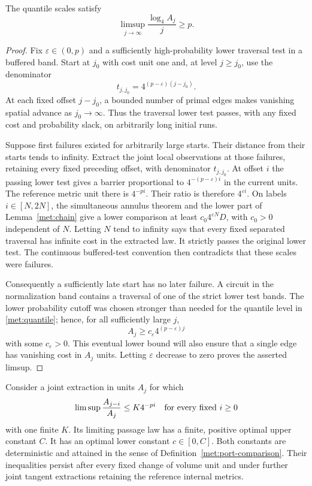 \begin{lemma}
\label{met:initial-growth}
The quantile scales satisfy
\[
 \limsup_{j\to\infty}\frac{\log_4 A_j}{j}\geq p.
\]
\end{lemma}

\begin{proof}
Fix $\varepsilon\in(0,p)$ and a sufficiently high-probability lower
traversal test in a buffered band.  Start at $j_0$ with cost unit one
and, at level $j\geq j_0$, use the denominator
\[
 t_{j,j_0}=4^{(p-\varepsilon)(j-j_0)}.
\]
At each fixed offset $j-j_0$, a bounded number of primal edges makes
vanishing spatial advance as $j_0\to\infty$.  Thus the traversal
lower test passes, with any fixed cost and probability slack, on
arbitrarily long initial runs.

Suppose first failures existed for arbitrarily large starts.  Their
distance from their starts tends to infinity.  Extract the joint local
observations at those failures, retaining every fixed preceding
offset, with denominator $t_{j,j_0}$.  At offset $i$ the passing lower
test gives a barrier proportional to
$4^{-(p-\varepsilon)i}$ in the current units.  The reference metric
unit there is $4^{-pi}$.  Their ratio is therefore $4^{\varepsilon i}$.
On labels $i\in[N,2N]$, the simultaneous annulus theorem and the lower
part of Lemma~\ref{met:chain} give a lower comparison at least
$c_0 4^{\varepsilon N}D$, with $c_0>0$ independent of $N$.
Letting $N$ tend to infinity says that every fixed separated traversal
has infinite cost in the extracted law.  It strictly passes the
original lower test.  The continuous buffered-test convention then
contradicts that these scales were failures.

Consequently a sufficiently late start has no later failure.  A
circuit in the normalization band contains a traversal of one of the
strict lower test bands.  The lower probability cutoff was chosen
stronger than needed for the quantile level in
\eqref{met:quantile}; hence, for all sufficiently large $j$,
\[
 A_j\geq c_\varepsilon 4^{(p-\varepsilon)j}
\]
with some $c_\varepsilon>0$.  This eventual lower bound will also ensure that a single edge has
vanishing cost in $A_j$ units.  Letting $\varepsilon$ decrease to zero
proves the asserted limsup.
\end{proof}

\begin{lemma}
\label{met:finite-upper}
Consider a joint extraction in units $A_j$ for which
\begin{equation}
 \limsup \frac{A_{j-i}}{A_j}\leq K4^{-pi}
 \quad\hbox{for every fixed }i\geq0
 \label{met:preceding-upper}
\end{equation}
with one finite $K$.  Its limiting passage law has a finite, positive
optimal upper constant $C$.  It has an optimal lower constant
$c\in[0,C]$.  Both constants are deterministic and attained in the
sense of Definition~\ref{met:port-comparison}.  Their inequalities
persist after every fixed change of volume unit and under further
joint tangent extractions retaining the reference internal metrics.
\end{lemma}

